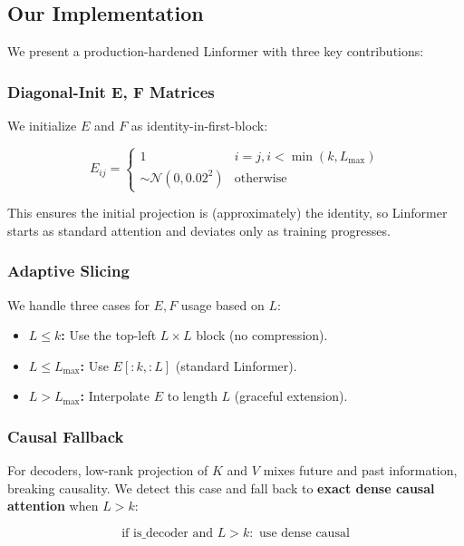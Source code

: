 \subsection{Our Implementation}

We present a production-hardened Linformer with three key contributions:

\subsubsection{Diagonal-Init E, F Matrices}

We initialize $E$ and $F$ as identity-in-first-block:

\[
E_{ij} = \begin{cases} 1 & i = j, i < \min(k, L_\text{max}) \\ \sim \mathcal{N}(0, 0.02^2) & \text{otherwise} \end{cases}
\tag{1.5}
\]

This ensures the initial projection is (approximately) the identity, so 
Linformer starts as standard attention and deviates only as training 
progresses.

\subsubsection{Adaptive Slicing}

We handle three cases for $E, F$ usage based on $L$:

\begin{itemize}
\item \textbf{$L \leq k$:} Use the top-left $L \times L$ block (no compression).
\item \textbf{$L \leq L_\text{max}$:} Use $E[:k, :L]$ (standard Linformer).
\item \textbf{$L > L_\text{max}$:} Interpolate $E$ to length $L$ (graceful extension).

\end{itemize}
\subsubsection{Causal Fallback}

For decoders, low-rank projection of $K$ and $V$ mixes future and past 
information, breaking causality. We detect this case and fall back to 
\textbf{exact dense causal attention} when $L > k$:

\[
\text{if } \text{is\_decoder} \text{ and } L > k: \text{ use dense causal}
\tag{1.6}
\]

